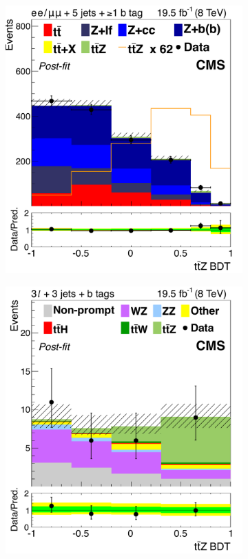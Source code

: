 \begin{figure}[tb]
  \centering
  \begin{subfigure}{0.33\textwidth}
    \includegraphics[width=\textwidth]{figures/eight-TeV/mva/lep_lep_SF_eq5j_ge1t_FinalBDT}
    \caption{}
    \label{sfig:8-ttZ-tl}
  \end{subfigure}%
  \begin{subfigure}{0.33\textwidth}
    \includegraphics[width=\textwidth]{figures/eight-TeV/mva/3l_eq3j_bloose_FinalBDT}

\end{subfigure}
\end{figure}
